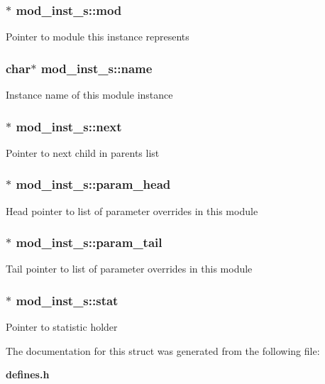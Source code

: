 \subsubsection{$\ast$ mod\_\-inst\_\-s::mod}\label{structmod__inst__s_m1}


Pointer to module this instance represents 
\subsubsection{\setlength{\rightskip}{0pt plus 5cm}char$\ast$ mod\_\-inst\_\-s::name}\label{structmod__inst__s_m0}


Instance name of this module instance 
\subsubsection{$\ast$ mod\_\-inst\_\-s::next}\label{structmod__inst__s_m7}


Pointer to next child in parents list 
\subsubsection{$\ast$ mod\_\-inst\_\-s::param\_\-head}\label{structmod__inst__s_m3}


Head pointer to list of parameter overrides in this module 
\subsubsection{$\ast$ mod\_\-inst\_\-s::param\_\-tail}\label{structmod__inst__s_m4}


Tail pointer to list of parameter overrides in this module 
\subsubsection{$\ast$ mod\_\-inst\_\-s::stat}\label{structmod__inst__s_m2}


Pointer to statistic holder 

The documentation for this struct was generated from the following file:\begin{CompactItemize}
\item 
{\bf defines.h}\end{CompactItemize}
